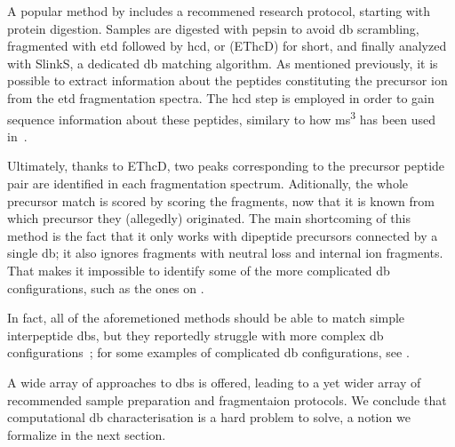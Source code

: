 A popular method by \citet{liu2014facilitating} includes a recommened research protocol, starting with protein digestion. Samples are digested with pepsin to avoid \gls*{db} scrambling, fragmented with \gls*{etd} followed by \gls*{hcd}, or (EThcD) for short, and finally analyzed with SlinkS, a dedicated \gls*{db} matching algorithm. As mentioned previously, it is possible to extract information about the peptides constituting the precursor ion from the \gls*{etd} fragmentation spectra. The \gls*{hcd} step is employed in order to gain sequence information about these peptides, similary to how \gls*{ms}\textsuperscript{3} has been used in~\cite{wu2009mass}.

Ultimately, thanks to EThcD, two peaks corresponding to the precursor peptide pair are identified in each fragmentation spectrum. Aditionally, the whole precursor match is scored by scoring the fragments, now that it is known from which precursor they (allegedly) originated. The main shortcoming of this method is the fact that it only works with dipeptide precursors connected by a single \gls*{db}; it also ignores fragments with neutral loss and internal ion fragments. That makes it impossible to identify some of the more complicated \gls*{db} configurations, such as the ones on .

In fact, all of the aforemetioned methods should be able to match simple interpeptide \glspl*{db}, but they reportedly struggle with more complex \gls*{db} configurations~\cite{lakbub2018recent}; for some examples of complicated \gls*{db} configurations, see .

A wide array of approaches to \glspl*{db} is offered, leading to a yet wider array of recommended sample preparation and fragmentaion protocols. We conclude that computational \gls*{db} characterisation is a hard problem to solve, a notion we formalize in the next section.

